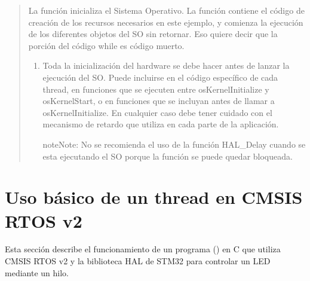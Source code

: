 \documentclass[letterpaper,10pt,english]{sphinxmanual}
\begin{document}
\begin{quote}
\begin{sphinxVerbatim}[commandchars=\\\{\},numbers=left,firstnumber=1,stepnumber=1]

\end{sphinxVerbatim}

\sphinxAtStartPar
La función  inicializa el Sistema Operativo. La función  contiene el código de creación de los recursos necesarios en este ejemplo, y  comienza la ejecución de los diferentes objetos del SO sin retornar.
Eso quiere decir que la porción del código while es código muerto.
\begin{enumerate}
%
\setcounter{enumi}{2}
\item {} 
\sphinxAtStartPar
Toda la inicialización del hardware se debe hacer antes de lanzar la ejecución del SO.
Puede incluirse en el código específico de cada thread, en funciones que se ejecuten entre osKernelInitialize y osKernelStart, o en funciones que se incluyan antes de llamar a osKernelInitialize. En cualquier caso debe tener cuidado con el mecanismo de retardo que utiliza en cada parte de la aplicación.

\begin{sphinxadmonition}{note}{Note:}
\sphinxAtStartPar
No se recomienda el uso de la función HAL\_Delay cuando se esta ejecutando el SO porque la función se puede quedar bloqueada.
\end{sphinxadmonition}

\end{enumerate}
\end{quote}

\sphinxstepscope


\chapter{Uso básico de un thread en CMSIS RTOS v2}
\label{\detokenize{ejemplothread:uso-basico-de-un-thread-en-cmsis-rtos-v2}}\label{\detokenize{ejemplothread:ejemplothread}}\label{\detokenize{ejemplothread::doc}}
\sphinxAtStartPar
Esta sección describe el funcionamiento de un programa () en C que utiliza CMSIS RTOS v2 y la biblioteca HAL de STM32 para controlar un LED mediante un hilo.
\end{document}

